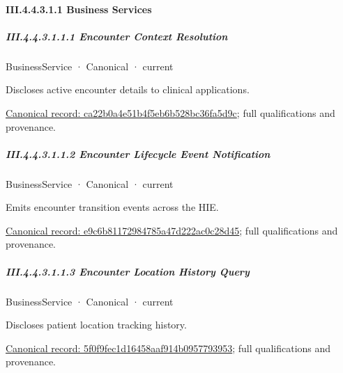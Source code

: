 \paragraph*{III.4.4.3.1.1 Business Services}
\label{navigation:III.4.4.3.1.1}

\subparagraph*{III.4.4.3.1.1.1 Encounter Context Resolution}
\label{navigation:III.4.4.3.1.1.1}

\label{element:ca22b0a4e51b4f5eb6b528bc36fa5d9c}
{\small BusinessService · Canonical · current}\par

Discloses active encounter details to clinical applications.


{\footnotesize \href{../../../../../../../continuum/business/business-service/ca22b0a4e51b4f5eb6b528bc36fa5d9c.md}{Canonical record: ca22b0a4e51b4f5eb6b528bc36fa5d9c}; full qualifications and provenance.}\par
\subparagraph*{III.4.4.3.1.1.2 Encounter Lifecycle Event Notification}
\label{navigation:III.4.4.3.1.1.2}

\label{element:e9c6b81172984785a47d222ac0c28d45}
{\small BusinessService · Canonical · current}\par

Emits encounter transition events across the HIE.


{\footnotesize \href{../../../../../../../continuum/business/business-service/e9c6b81172984785a47d222ac0c28d45.md}{Canonical record: e9c6b81172984785a47d222ac0c28d45}; full qualifications and provenance.}\par
\subparagraph*{III.4.4.3.1.1.3 Encounter Location History Query}
\label{navigation:III.4.4.3.1.1.3}

\label{element:5f0f9fec1d16458aaf914b0957793953}
{\small BusinessService · Canonical · current}\par

Discloses patient location tracking history.


{\footnotesize \href{../../../../../../../continuum/business/business-service/5f0f9fec1d16458aaf914b0957793953.md}{Canonical record: 5f0f9fec1d16458aaf914b0957793953}; full qualifications and provenance.}\par
